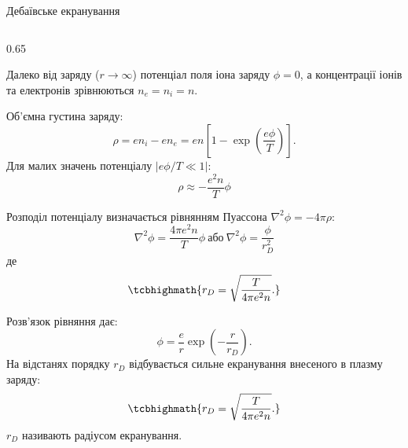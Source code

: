 \documentclass[]{beamer}
\begin{document}
\begin{frame}{Дебаївське екранування}{}
\begin{columns}
\begin{column}[t]{0.65\linewidth}
\begin{overprint}
\begin{block}{}
					Далеко від заряду ($r \to \infty$) потенціал поля іона заряду $\phi = 0$, а концентрації іонів та електронів зрівнюються $n_e = n_i  = n$.
				\end{block}
				\begin{block}{}\justifying\small
					Об'ємна густина заряду:
					\begin{equation*}
						\rho = en_i - en_e = en\left[1 - \exp{\left( \frac{e\phi}{T}\right) }\right].
					\end{equation*}
					Для малих значень потенціалу $|e\phi/T \ll 1|$:
					\begin{equation*}
						\rho \approx -\frac{e^2n}{T}\phi
					\end{equation*}
				\end{block}
				\begin{block}{}\justifying\small
					Розподіл потенціалу визначається рівнянням Пуассона $\nabla^2\phi = -4\pi\rho$:
					\begin{equation*}
						\nabla^2\phi = \frac{4\pi e^2n}{T}\phi\ \text{або}\  \nabla^2\phi = \frac{\phi}{r_D^2}
					\end{equation*}
					де
					\begin{equation*}
						\tcbhighmath{\rD .}
					\end{equation*}
				\end{block}
				\begin{block}{}\justifying\small
					Розв'язок рівняння дає:
					\begin{equation*}
						\phi = \frac{e}{r}\exp{\left( -\frac{r}{r_D}\right) }.
					\end{equation*}
					На відстанях порядку $r_D$ відбувається сильне екранування внесеного в плазму заряду:
					\begin{equation*}
						\tcbhighmath{\rD.}
					\end{equation*}
					$r_D$ називають радіусом екранування.
				\end{block}
				\begin{block}{}
					
				\end{block}
			\end{overprint}
		\end{column}
	\end{columns}

\end{frame}
\end{document}
